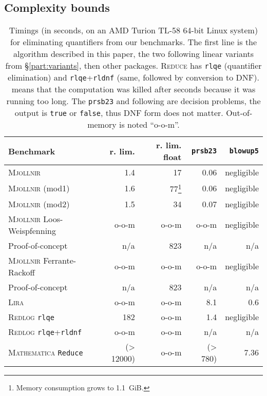 \subsection{Complexity bounds}
\label{part:complexity}
\begin{table}[htb]\renewcommand{\footnoterule}{}\makeatletter \setlength{\skip\@mpfootins}{1ex}\makeatother \begin{minipage}{\textwidth}\begin{center}\small \begin{tabular}{|l|r|r|r|r|}
\hline
Benchmark & r. lim.  & r. lim. float & \texttt{prsb23} & \texttt{blowup5} \\
\hline
\textsc{Mjollnir} & 1.4 & 17 & 0.06 & negligible \\
\textsc{Mjollnir} (mod1) & 1.6 & 77\footnote{Memory consumption grows to 1.1~GiB.} & 0.06 & negligible\\
\textsc{Mjollnir} (mod2) & 1.5 & 34 & 0.07 & negligible\\
\textsc{Mjollnir} Loos-Weispfenning & o-o-m & o-o-m & o-o-m & negligible \\
Proof-of-concept & n/a & 823 & n/a & n/a \\
\textsc{Mjollnir} Ferrante-Rackoff & o-o-m & o-o-m & o-o-m & negligible \\
Proof-of-concept & n/a & 823 & n/a & n/a \\
\textsc{Lira} & o-o-m & o-o-m & 8.1 & 0.6\\
\textsc{Redlog} \texttt{rlqe} & 182  & o-o-m & 1.4 & negligible \\
\textsc{Redlog} \texttt{rlqe}+\texttt{rldnf} & o-o-m  & o-o-m  & n/a & n/a\\
\textsc{Mathematica} \texttt{Reduce} & (> 12000) & o-o-m & (> 780) & 7.36\\
\hline
\end{tabular}
\end{center}
\end{minipage}

\caption{Timings (in seconds, on an AMD Turion TL-58 64-bit Linux system) for eliminating quantifiers from our benchmarks. The first line is the algorithm described in this paper, the two following linear variants from \S\ref{part:variants}, then other packages. \textsc{Reduce} has \texttt{rlqe} (quantifier elimination) and \texttt{rlqe}+\texttt{rldnf} (same, followed by conversion to DNF).  means that the computation was killed after  seconds because it was running too long. The \texttt{prsb23} and following are decision problems, the output is \texttt{true} or \texttt{false}, thus DNF form does not matter. Out-of-memory is noted ``o-o-m''.}
\label{tab:benchmarks1}
\end{table}


